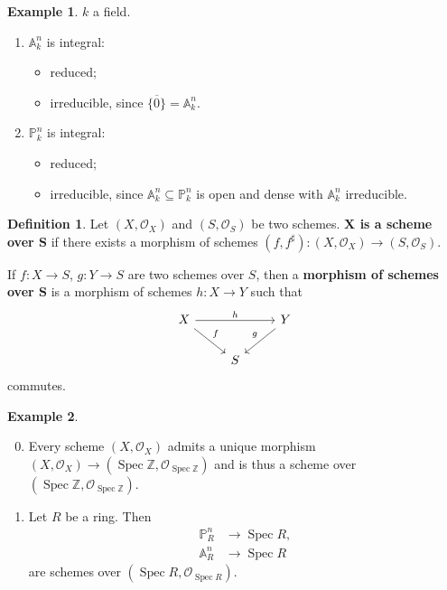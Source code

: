 \documentclass[12pt]{article}
\DeclareMathOperator{\Spec}{Spec}
\theoremstyle{definition}
\newtheorem*{definition}{Definition}
\newtheorem*{example}{Example}
\theoremstyle{remark}
\begin{document}
\begin{example}
$k$ a field.
\begin{enumerate}[label=\arabic*)]
\item $\mathbb{A}_k^n$ is integral:
\begin{itemize}[label=$-$]
\item reduced;
\item irreducible, since $\overline{\{0\}}=\mathbb{A}_k^n$.
\end{itemize}

\item $\mathbb{P}_k^n$ is integral:
\begin{itemize}[label=$-$]
\item reduced;
\item irreducible, since $\mathbb{A}_k^n\subseteq\mathbb{P}_k^n$ is open and dense with $\mathbb{A}_k^n$ irreducible.
\end{itemize}
\end{enumerate}
\end{example}

\begin{definition}
Let $(X,\mathcal{O}_X)$ and $(S,\mathcal{O}_S)$ be two schemes. \textbf{$\boldsymbol{X}$ is a scheme over $\boldsymbol{S}$} if there exists a morphism of schemes $(f,f^{\sharp}):(X,\mathcal{O}_X)\rightarrow(S,\mathcal{O}_S)$.

If $f:X\rightarrow S$, $g:Y\rightarrow S$ are two schemes over $S$, then a \textbf{morphism of schemes over $\boldsymbol{S}$} is a morphism of schemes $h:X\rightarrow Y$ such that
\[
\begin{tikzcd}
X\arrow[rr,"h"]\arrow[rd,"f"]&&Y\arrow[dl,"g",swap]\\
&S
\end{tikzcd}
\]
commutes.
\end{definition}

\begin{example}
\begin{enumerate}[label=\arabic*)]
\setcounter{enumi}{-1}
\item Every scheme $(X,\mathcal{O}_X)$ admits a unique morphism $(X,\mathcal{O}_X)\rightarrow(\Spec\mathbb{Z},\mathcal{O}_{\Spec\mathbb{Z}})$ and is thus a scheme over $(\Spec\mathbb{Z},\mathcal{O}_{\Spec\mathbb{Z}})$.

\item Let $R$ be a ring. Then
\begin{align*}
\mathbb{P}_R^n&\longrightarrow\Spec R,\\
\mathbb{A}_R^n&\longrightarrow\Spec R
\end{align*}
are schemes over $(\Spec R,\mathcal{O}_{\Spec R})$.
\end{enumerate}
\end{example}
\end{document}
